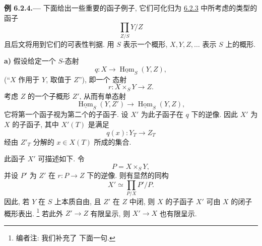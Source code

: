 
\medskip
{}\label{ex:sga3-VIB-6.2.4}%
\noindent\textbf{例 6.2.4.---}
下面给出一些重要的函子例子, 它们可化归为
\hyperref[thm:sga3-VIB-6.2.3]{6.2.3} 中所考虑的类型的函子
\[
  \prod_{Z/S}Y/Z
\]
且后文将用到它们的可表性判据.
用 \(S\) 表示一个概形,
\(X,Y,Z,\ldots\) 表示 \(S\) 上的概形.

\medskip
{}\label{ex:sga3-VIB-6.2.4-a}%
\noindent\textbf{a)}
假设给定一个 \(S\)-态射
\begin{equation}
  q:X\longrightarrow\underline{\operatorname{Hom}}_S(Y,Z),
  \tag{x}\label{eq:sga3-VIB-6.2.4-x}
\end{equation}
(``\(X\) 作用于 \(Y\), 取值于 \(Z\)''), 即一个
态射
\begin{equation}
  r:X\times_S Y\longrightarrow Z.
  \tag{xx}\label{eq:sga3-VIB-6.2.4-xx}
\end{equation}
考虑 \(Z\) 的一个子概形 \(Z'\), 从而有单态射
\[
  \underline{\operatorname{Hom}}_S(Y,Z')
  \longrightarrow
  \underline{\operatorname{Hom}}_S(Y,Z),
\]
它将第一个函子视为第二个的子函子. 设
\(X'\) 为此子函子在 \(q\) 下的逆像. 因此
\(X'\) 为 \(X\) 的子函子, 其中 \(X'(T)\) 是满足
\[
  q(x):Y_T\longrightarrow Z_T
\]
经由 \(Z'_T\) 分解的 \(x\in X(T)\) 所成的集合.

此函子 \(X'\) 可描述如下. 令
\[
  P=X\times_S Y,
\]
并设 \(P'\) 为 \(Z'\) 在
\(r:P\to Z\) 下的逆像. 则有显然的同构
\begin{equation}
  X'\simeq\prod_{P/X}P'/P.
  \tag{xxx}\label{eq:sga3-VIB-6.2.4-xxx}
\end{equation}
因此, 若 \(Y\) 在 \(S\) 上本质自由,
且 \(Z'\) 在 \(Z\) 中闭, 则 \(X\) 的子函子 \(X'\)
可由 \(X\) 的闭子概形表出.%
\footnote{\label{note:sga3-VIB-56}编者注: 我们补充了
下面一句.}
若此外 \(Z'\to Z\) 有限呈示, 则
\(X'\to X\) 也有限呈示.

